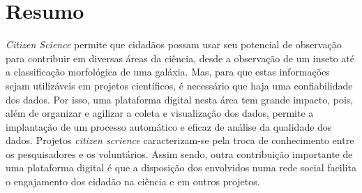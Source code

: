 \section*{Resumo}

\emph{Citizen Science} permite que cidadãos possam usar seu potencial de observação para contribuir em diversas áreas da ciência, desde a observação de um inseto até a classificação morfológica de uma galáxia. Mas, para que estas informações sejam utilizáveis em projetos científicos, é necessário que haja uma confiabilidade dos dados. Por isso, uma plataforma digital nesta área tem grande impacto, pois, além de organizar e agilizar a coleta e visualização dos dados, permite a implantação de um processo automático e eficaz de análise da qualidade dos dados. Projetos \emph{citizen scrience} caracterizam-se pela troca de conhecimento entre os pesquisadores e os voluntários. Assim sendo, outra contribuição importante de uma plataforma digital é que a disposição dos envolvidos numa rede social facilita o engajamento dos cidadão na ciência e em outros projetos.